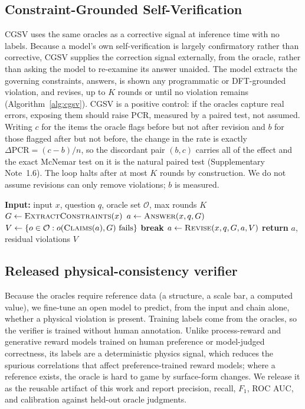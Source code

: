 \documentclass[pdflatex,sn-nature]{sn-jnl}
\begin{document}
\subsection*{Constraint-Grounded Self-Verification}
CGSV uses the same oracles as a corrective signal at inference time with no labels.
Because a model's own self-verification is largely confirmatory rather than
corrective,\cite{selfverify2026} CGSV supplies the correction signal externally, from the
oracle, rather than asking the model to re-examine its answer unaided. The model extracts
the governing constraints, answers, is shown any programmatic or DFT-grounded violation,
and revises, up to $K$ rounds or until no violation remains (Algorithm~\ref{alg:cgsv}).
CGSV is a positive control: if the oracles capture real errors, exposing them should raise
PCR, measured by a paired test, not assumed. Writing $c$ for the items the oracle flags
before but not after revision and $b$ for those flagged after but not before, the change in
the rate is exactly $\Delta\mathrm{PCR}=(c-b)/n$, so the discordant pair $(b,c)$ carries all
of the effect and the exact McNemar test on it is the natural paired test
(Supplementary Note~1.6). The loop halts after at most $K$ rounds by construction. We do not
assume revisions can only remove violations; $b$ is measured.

\begin{algorithm}[t]
\caption{Constraint-Grounded Self-Verification}
\label{alg:cgsv}
\begin{algorithmic}[1]
\State \textbf{Input:} input $x$, question $q$, oracle set $\mathcal{O}$, max rounds $K$
\State $G \gets \textsc{ExtractConstraints}(x)$
\State $a \gets \textsc{Answer}(x,q,G)$
  \State $V \gets \{o \in \mathcal{O} : o(\textsc{Claims}(a), G)\ \text{fails}\}$
   \State \textbf{break} \EndIf
  \State $a \gets \textsc{Revise}(x, q, G, a, V)$
\EndFor
\State \textbf{return} $a$, residual violations $V$
\end{algorithmic}
\end{algorithm}

\subsection*{Released physical-consistency verifier}
Because the oracles require reference data (a structure, a scale bar, a computed
value), we fine-tune an open model to predict, from the input and chain alone,
whether a physical violation is present. Training labels come from the oracles, so the
verifier is trained without human annotation. Unlike process-reward and generative
reward models trained on human preference or model-judged
correctness,\cite{processbench2025,compassverifier2025} its labels are a deterministic
physics signal, which reduces the spurious correlations that affect preference-trained
reward models; where a reference exists, the oracle is hard to game by surface-form changes. We release it as the reusable artifact of this work and report precision,
recall, $F_1$, ROC AUC, and calibration against held-out oracle judgments.
\end{document}
